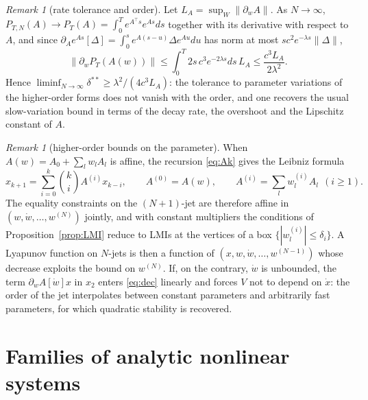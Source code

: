 \documentclass[preprint,12pt,authoryear]{elsarticle}
\theoremstyle{definition}
\theoremstyle{remark}
\newtheorem{remark}[theorem]{Remark}
\newcommand{\tr}{^{\top}}
\begin{document}
\begin{remark}[rate tolerance and order]
Let $L_A=\sup_W\|\partial_wA\|$. As $N\to\infty$, $P_{T,N}(A)\to P_T(A)=\int_0^Te^{A\tr s}e^{As}ds$ together with its derivative with respect to $A$, and since $\partial_Ae^{As}[\Delta]=\int_0^se^{A(s-u)}\Delta e^{Au}du$ has norm at most $sc^2e^{-\lambda s}\|\Delta\|$,
\begin{equation}
\|\partial_wP_T(A(w))\|\le\int_0^T2s\,c^3e^{-2\lambda s}ds\,L_A\le\frac{c^3L_A}{2\lambda^2}.
\end{equation}
Hence $\liminf_{N\to\infty}\delta^{**}\ge\lambda^2/(4c^3L_A)$: the tolerance to parameter variations of the higher-order forms does not vanish with the order, and one recovers the usual slow-variation bound in terms of the decay rate, the overshoot and the Lipschitz constant of $A$.
\end{remark}

\begin{remark}[higher-order bounds on the parameter]\label{rem:leibniz}
When $A(w)=A_0+\sum_lw_lA_l$ is affine, the recursion \eqref{eq:Ak} gives the Leibniz formula
\begin{equation}
x_{k+1}=\sum_{i=0}^k\binom{k}{i}A^{(i)}x_{k-i},\qquad A^{(0)}=A(w),\qquad A^{(i)}=\sum_lw_l^{(i)}A_l\ \ (i\ge1).
\end{equation} The equality constraints on the $(N+1)$-jet are therefore affine in $(w,\dot w,\dots,w^{(N)})$ jointly, and with constant multipliers the conditions of Proposition~\ref{prop:LMI} reduce to LMIs at the vertices of a box $\{|w_l^{(i)}|\le\delta_i\}$. A Lyapunov function on $N$-jets is then a function of $(x,w,\dot w,\dots,w^{(N-1)})$ whose decrease exploits the bound on $w^{(N)}$. If, on the contrary, $\dot w$ is unbounded, the term $\partial_wA[\dot w]x$ in $x_2$ enters \eqref{eq:dec} linearly and forces $V$ not to depend on $\dot x$: the order of the jet interpolates between constant parameters and arbitrarily fast parameters, for which quadratic stability is recovered.
\end{remark}

\section{Families of analytic nonlinear systems}\label{sec:NL}
\end{document}
